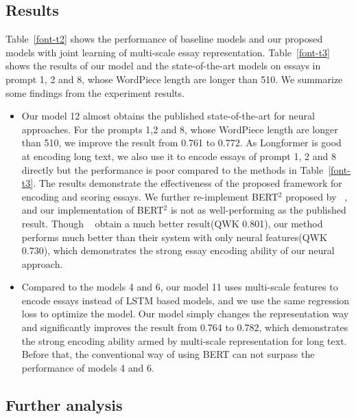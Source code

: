 \documentclass[11pt]{article}
\begin{document}
\subsection{Results}





Table~\ref{font-t2} shows the performance of baseline models and our proposed models with joint learning of multi-scale essay representation. Table~\ref{font-t3} shows the results of our model and the state-of-the-art models on essays in prompt 1, 2 and 8, whose WordPiece length are longer than 510.
We summarize some findings from the experiment results.

\begin{itemize}
\item Our model 12 almost obtains the published state-of-the-art for neural approaches.
For the prompts 1,2 and 8, whose WordPiece length are longer than 510, we improve the result from 0.761 to 0.772. As Longformer is good at encoding long text, we also use it to encode essays of prompt 1, 2 and 8 directly but the performance is poor compared to the methods in Table~\ref{font-t3}. 
The results demonstrate the effectiveness of the proposed framework for encoding and scoring essays. We further re-implement BERT$^2$ proposed by ~\citep{Yang:2020}, and our implementation of BERT$^2$ is not as well-performing as the published result. Though ~\citep{Uto:2020} obtain a much better result(QWK 0.801), our method performs much better than their system with only neural features(QWK 0.730), which demonstrates the strong essay encoding ability of our neural approach.

\item Compared to the models 4 and 6, our model 11 uses multi-scale features to encode essays instead of LSTM based models, and we use the same regression loss to optimize the model.
Our model simply changes the representation way and significantly improves the result from 0.764 to 0.782, which demonstrates the strong encoding ability armed by multi-scale representation for long text. Before that, the conventional way of using BERT can not surpass the performance of models 4 and 6. 



\end{itemize}


\subsection{Further analysis}
\end{document}
